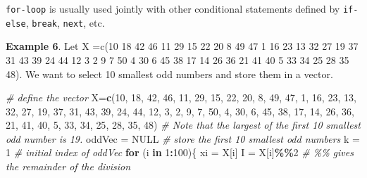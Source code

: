 \documentclass[
]{book}
\newenvironment{Shaded}{\begin{snugshade}}{\end{snugshade}}
\newcommand{\CommentTok}[1]{\textcolor[rgb]{0.56,0.35,0.01}{\textit{#1}}}
\newcommand{\ConstantTok}[1]{\textcolor[rgb]{0.56,0.35,0.01}{#1}}
\newcommand{\ControlFlowTok}[1]{\textcolor[rgb]{0.13,0.29,0.53}{\textbf{#1}}}
\newcommand{\DecValTok}[1]{\textcolor[rgb]{0.00,0.00,0.81}{#1}}
\newcommand{\FunctionTok}[1]{\textcolor[rgb]{0.13,0.29,0.53}{\textbf{#1}}}
\newcommand{\NormalTok}[1]{#1}
\newcommand{\OtherTok}[1]{\textcolor[rgb]{0.56,0.35,0.01}{#1}}
\newcommand{\SpecialCharTok}[1]{\textcolor[rgb]{0.81,0.36,0.00}{\textbf{#1}}}
\begin{document}
\texttt{for-loop} is usually used jointly with other conditional statements defined by \texttt{if-else}, \texttt{break}, \texttt{next}, etc.

\textbf{Example 6}. Let X =c(10 18 42 46 11 29 15 22 20 8 49 47 1 16 23 13 32 27 19 37 31 43 39 24 44 12 3 2 9 7 50 4 30 6 45 38 17 14 26 36 21 41 40 5 33 34 25 28 35 48). We want to select 10 smallest odd numbers and store them in a vector.

\begin{Shaded}
\begin{Highlighting}[]
\CommentTok{\# define the vector}
\NormalTok{ X}\OtherTok{=}\FunctionTok{c}\NormalTok{(}\DecValTok{10}\NormalTok{, }\DecValTok{18}\NormalTok{, }\DecValTok{42}\NormalTok{, }\DecValTok{46}\NormalTok{, }\DecValTok{11}\NormalTok{, }\DecValTok{29}\NormalTok{, }\DecValTok{15}\NormalTok{, }\DecValTok{22}\NormalTok{, }\DecValTok{20}\NormalTok{, }\DecValTok{8}\NormalTok{, }\DecValTok{49}\NormalTok{, }\DecValTok{47}\NormalTok{, }\DecValTok{1}\NormalTok{, }\DecValTok{16}\NormalTok{, }\DecValTok{23}\NormalTok{, }\DecValTok{13}\NormalTok{, }\DecValTok{32}\NormalTok{, }\DecValTok{27}\NormalTok{,}
     \DecValTok{19}\NormalTok{, }\DecValTok{37}\NormalTok{, }\DecValTok{31}\NormalTok{, }\DecValTok{43}\NormalTok{, }\DecValTok{39}\NormalTok{, }\DecValTok{24}\NormalTok{, }\DecValTok{44}\NormalTok{, }\DecValTok{12}\NormalTok{, }\DecValTok{3}\NormalTok{, }\DecValTok{2}\NormalTok{, }\DecValTok{9}\NormalTok{, }\DecValTok{7}\NormalTok{, }\DecValTok{50}\NormalTok{, }\DecValTok{4}\NormalTok{, }\DecValTok{30}\NormalTok{, }\DecValTok{6}\NormalTok{, }\DecValTok{45}\NormalTok{, }\DecValTok{38}\NormalTok{, }\DecValTok{17}\NormalTok{,}
     \DecValTok{14}\NormalTok{, }\DecValTok{26}\NormalTok{, }\DecValTok{36}\NormalTok{, }\DecValTok{21}\NormalTok{, }\DecValTok{41}\NormalTok{, }\DecValTok{40}\NormalTok{, }\DecValTok{5}\NormalTok{, }\DecValTok{33}\NormalTok{, }\DecValTok{34}\NormalTok{, }\DecValTok{25}\NormalTok{, }\DecValTok{28}\NormalTok{, }\DecValTok{35}\NormalTok{, }\DecValTok{48}\NormalTok{)}
\CommentTok{\# Note that the largest of the first 10 smallest odd number is 19.}
\NormalTok{oddVec }\OtherTok{=} \ConstantTok{NULL}     \CommentTok{\# store the first 10 smallest odd numbers}
\NormalTok{k }\OtherTok{=} \DecValTok{1}             \CommentTok{\# initial index of oddVec}
\ControlFlowTok{for}\NormalTok{ (i }\ControlFlowTok{in} \DecValTok{1}\SpecialCharTok{:}\DecValTok{100}\NormalTok{)\{}
\NormalTok{     xi }\OtherTok{=}\NormalTok{ X[i]}
\NormalTok{     I }\OtherTok{=}\NormalTok{ X[i]}\SpecialCharTok{\%\%}\DecValTok{2}         \CommentTok{\# \%\% gives the remainder of the division }

\end{Highlighting}
\end{Shaded}
\end{document}
